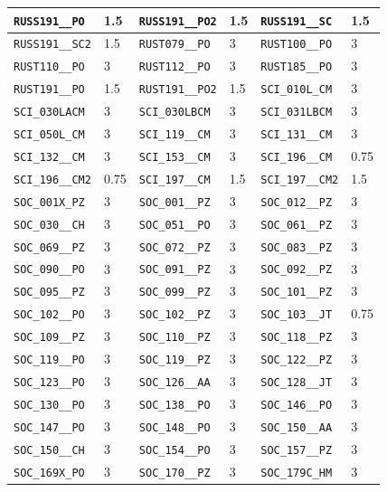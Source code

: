 \begin{longtable}{|l|l||l|l||l|l|}
    \verb|RUSS191__PO| & 1.5 & \verb|RUSS191__PO2| & 1.5 & \verb|RUSS191__SC| & 1.5\\\hline
    \verb|RUSS191__SC2| & 1.5 & \verb|RUST079__PO| & 3 & \verb|RUST100__PO| & 3\\\hline
    \verb|RUST110__PO| & 3 & \verb|RUST112__PO| & 3 & \verb|RUST185__PO| & 3\\\hline
    \verb|RUST191__PO| & 1.5 & \verb|RUST191__PO2| & 1.5 & \verb|SCI_010L_CM| & 3\\\hline
    \verb|SCI_030LACM| & 3 & \verb|SCI_030LBCM| & 3 & \verb|SCI_031LBCM| & 3\\\hline
    \verb|SCI_050L_CM| & 3 & \verb|SCI_119__CM| & 3 & \verb|SCI_131__CM| & 3\\\hline
    \verb|SCI_132__CM| & 3 & \verb|SCI_153__CM| & 3 & \verb|SCI_196__CM| & 0.75\\\hline
    \verb|SCI_196__CM2| & 0.75 & \verb|SCI_197__CM| & 1.5 & \verb|SCI_197__CM2| & 1.5\\\hline
    \verb|SOC_001X_PZ| & 3 & \verb|SOC_001__PZ| & 3 & \verb|SOC_012__PZ| & 3\\\hline
    \verb|SOC_030__CH| & 3 & \verb|SOC_051__PO| & 3 & \verb|SOC_061__PZ| & 3\\\hline
    \verb|SOC_069__PZ| & 3 & \verb|SOC_072__PZ| & 3 & \verb|SOC_083__PZ| & 3\\\hline
    \verb|SOC_090__PO| & 3 & \verb|SOC_091__PZ| & 3 & \verb|SOC_092__PZ| & 3\\\hline
    \verb|SOC_095__PZ| & 3 & \verb|SOC_099__PZ| & 3 & \verb|SOC_101__PZ| & 3\\\hline
    \verb|SOC_102__PO| & 3 & \verb|SOC_102__PZ| & 3 & \verb|SOC_103__JT| & 0.75\\\hline
    \verb|SOC_109__PZ| & 3 & \verb|SOC_110__PZ| & 3 & \verb|SOC_118__PZ| & 3\\\hline
    \verb|SOC_119__PO| & 3 & \verb|SOC_119__PZ| & 3 & \verb|SOC_122__PZ| & 3\\\hline
    \verb|SOC_123__PO| & 3 & \verb|SOC_126__AA| & 3 & \verb|SOC_128__JT| & 3\\\hline
    \verb|SOC_130__PO| & 3 & \verb|SOC_138__PO| & 3 & \verb|SOC_146__PO| & 3\\\hline
    \verb|SOC_147__PO| & 3 & \verb|SOC_148__PO| & 3 & \verb|SOC_150__AA| & 3\\\hline
    \verb|SOC_150__CH| & 3 & \verb|SOC_154__PO| & 3 & \verb|SOC_157__PZ| & 3\\\hline
    \verb|SOC_169X_PO| & 3 & \verb|SOC_170__PZ| & 3 & \verb|SOC_179C_HM| & 3\\\hline

\end{longtable}
